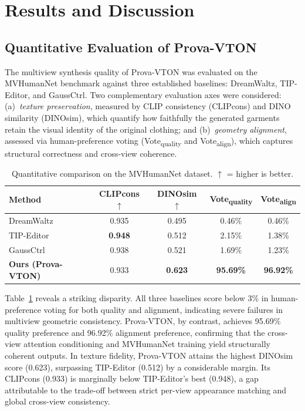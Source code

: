 \section{Results and Discussion}

\subsection{Quantitative Evaluation of Prova-VTON}

The multiview synthesis quality of Prova-VTON was evaluated on the MVHumanNet benchmark against three established baselines: DreamWaltz, TIP-Editor, and GaussCtrl. Two complementary evaluation axes were considered: (a)~\textit{texture preservation}, measured by CLIP consistency (CLIPcons) and DINO similarity (DINOsim), which quantify how faithfully the generated garments retain the visual identity of the original clothing; and (b)~\textit{geometry alignment}, assessed via human-preference voting (Vote\textsubscript{quality} and Vote\textsubscript{align}), which captures structural correctness and cross-view coherence.

\begin{table}[H]
\caption{Quantitative comparison on the MVHumanNet dataset. $\uparrow$ = higher is better.}
\label{tab:quantitative}
\centering
\begin{tabular}{l cccc}
\toprule
\textbf{Method} & \textbf{CLIPcons} $\uparrow$ & \textbf{DINOsim} $\uparrow$ & \textbf{Vote\textsubscript{quality}} & \textbf{Vote\textsubscript{align}} \\
\midrule
DreamWaltz & 0.935 & 0.495 & 0.46\% & 0.46\% \\
TIP-Editor & \textbf{0.948} & 0.512 & 2.15\% & 1.38\% \\
GaussCtrl & 0.938 & 0.521 & 1.69\% & 1.23\% \\
\textbf{Ours (Prova-VTON)} & 0.933 & \textbf{0.623} & \textbf{95.69\%} & \textbf{96.92\%} \\
\bottomrule
\end{tabular}
\end{table}

Table~\ref{tab:quantitative} reveals a striking disparity. All three baselines score below 3\% in human-preference voting for both quality and alignment, indicating severe failures in multiview geometric consistency. Prova-VTON, by contrast, achieves 95.69\% quality preference and 96.92\% alignment preference, confirming that the cross-view attention conditioning and MVHumanNet training yield structurally coherent outputs. In texture fidelity, Prova-VTON attains the highest DINOsim score (0.623), surpassing TIP-Editor (0.512) by a considerable margin. Its CLIPcons (0.933) is marginally below TIP-Editor's best (0.948), a gap attributable to the trade-off between strict per-view appearance matching and global cross-view consistency.

